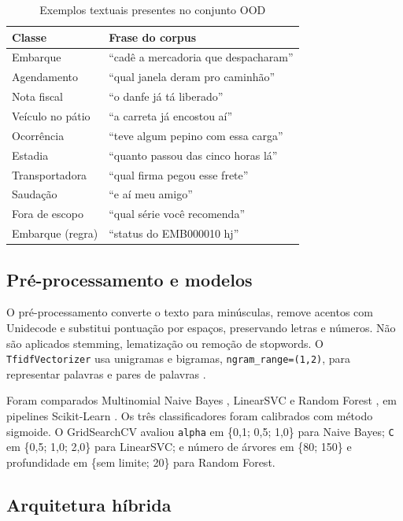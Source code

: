 \documentclass[conference]{IEEEtran}
\begin{document}
\begin{table}[t]
\centering
\caption{Exemplos textuais presentes no conjunto OOD}
\label{tab:ood-examples}
\scriptsize
\begin{tabular}{ll}
\toprule
Classe & Frase do corpus \\
\midrule
Embarque & ``cadê a mercadoria que despacharam'' \\
Agendamento & ``qual janela deram pro caminhão'' \\
Nota fiscal & ``o danfe já tá liberado'' \\
Veículo no pátio & ``a carreta já encostou aí'' \\
Ocorrência & ``teve algum pepino com essa carga'' \\
Estadia & ``quanto passou das cinco horas lá'' \\
Transportadora & ``qual firma pegou esse frete'' \\
Saudação & ``e aí meu amigo'' \\
Fora de escopo & ``qual série você recomenda'' \\
Embarque (regra) & ``status do EMB000010 hj'' \\
\bottomrule
\end{tabular}
\end{table}

\subsection{Pré-processamento e modelos}

O pré-processamento converte o texto para minúsculas, remove acentos com Unidecode e substitui pontuação por espaços, preservando letras e números. Não são aplicados stemming, lematização ou remoção de stopwords. O \texttt{TfidfVectorizer} usa unigramas e bigramas, \texttt{ngram\_range=(1,2)}, para representar palavras e pares de palavras \cite{salton,manning}.

Foram comparados Multinomial Naive Bayes \cite{mccallum}, LinearSVC \cite{cortes,joachims} e Random Forest \cite{breiman}, em pipelines Scikit-Learn \cite{pedregosa}. Os três classificadores foram calibrados com método sigmoide. O GridSearchCV avaliou \texttt{alpha} em \{0,1; 0,5; 1,0\} para Naive Bayes; \texttt{C} em \{0,5; 1,0; 2,0\} para LinearSVC; e número de árvores em \{80; 150\} e profundidade em \{sem limite; 20\} para Random Forest.

\subsection{Arquitetura híbrida}
\end{document}

